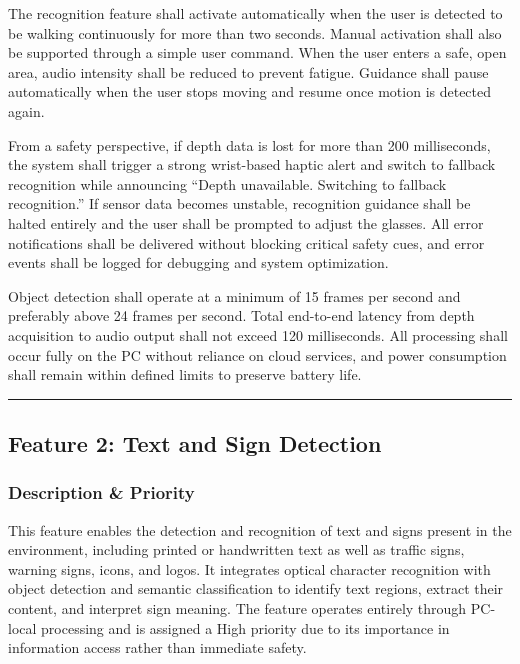 The recognition feature shall activate automatically when the user is detected to be walking continuously for more than two seconds. Manual activation shall also be supported through a simple user command. When the user enters a safe, open area, audio intensity shall be reduced to prevent fatigue. Guidance shall pause automatically when the user stops moving and resume once motion is detected again.

From a safety perspective, if depth data is lost for more than 200 milliseconds, the system shall trigger a strong wrist-based haptic alert and switch to fallback recognition while announcing “Depth unavailable. Switching to fallback recognition.” If sensor data becomes unstable, recognition guidance shall be halted entirely and the user shall be prompted to adjust the glasses. All error notifications shall be delivered without blocking critical safety cues, and error events shall be logged for debugging and system optimization.

Object detection shall operate at a minimum of 15 frames per second and preferably above 24 frames per second. Total end-to-end latency from depth acquisition to audio output shall not exceed 120 milliseconds. All processing shall occur fully on the PC without reliance on cloud services, and power consumption shall remain within defined limits to preserve battery life.

\par\medskip\noindent\rule{\linewidth}{0.4pt}\par\medskip

\subsection{Feature 2: Text and Sign Detection}

\subsubsection{Description \& Priority}

This feature enables the detection and recognition of text and signs present in the environment, including printed or handwritten text as well as traffic signs, warning signs, icons, and logos. It integrates optical character recognition with object detection and semantic classification to identify text regions, extract their content, and interpret sign meaning. The feature operates entirely through PC-local processing and is assigned a High priority due to its importance in information access rather than immediate safety.

